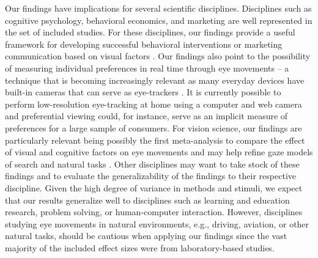 \documentclass[english,natbib,man,floatsintext]{apa6}
\begin{document}
Our findings have implications for several scientific disciplines. Disciplines such as cognitive psychology, behavioral economics, and marketing are well represented in the set of included studies. For these disciplines, our findings provide a useful framework for developing successful behavioral interventions or marketing communication based on visual factors \citep{muenscher2016a, orquinwedel2020}. Our findings also point to the possibility of measuring individual preferences in real time through eye movements -- a technique that is becoming increasingly relevant as many everyday devices have built-in cameras that can serve as eye-trackers \citep{bulling2019a}. It is currently possible to perform low-resolution eye-tracking at home using a computer and web camera and preferential viewing could, for instance, serve as an implicit measure of preferences for a large sample of consumers. For vision science, our findings are particularly relevant being possibly the first meta-analysis to compare the effect of visual and cognitive factors on eye movements and may help refine gaze models of search \citep{vanderlans2008} and natural tasks \citep{hayhoe2005}. Other disciplines may want to take stock of these findings and to evaluate the generalizability of the findings to their respective discipline. Given the high degree of variance in methods and stimuli, we expect that our results generalize well to disciplines such as learning and education research, problem solving, or human-computer interaction. However, disciplines studying eye movements in natural environments, e.g., driving, aviation, or other natural tasks, should be cautious when applying our findings since the vast majority of the included effect sizes were from laboratory-based studies.\\ 
\end{document}
